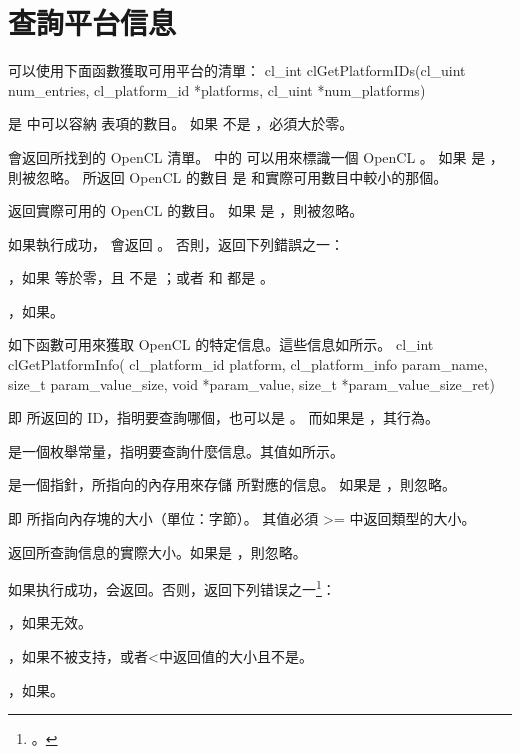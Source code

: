 \section{查詢平台信息}
可以使用下面函數獲取可用平台的清單：
\startclc
cl_int clGetPlatformIDs(cl_uint num_entries,
			cl_platform_id *platforms,
			cl_uint *num_platforms)
\stopclc

 是  中可以容納  表項的數目。
如果  不是 ，必須大於零。

 會返回所找到的 OpenCL  清單。
 中的  可以用來標識一個 OpenCL 。
如果  是 ，則被忽略。
所返回 OpenCL  的數目 是  和實際可用數目中較小的那個。

 返回實際可用的 OpenCL  的數目。
如果  是 ，則被忽略。

如果執行成功， 會返回 。
否則，返回下列錯誤之一：
\startigBase
\item {}，如果  等於零，且  不是 ；或者  和  都是 。
\item {}，如果\schostfailres。
\stopigBase

如下函數可用來獲取 OpenCL 的特定信息。這些信息如所示。
\startclc
cl_int clGetPlatformInfo(
		cl_platform_id platform,
		cl_platform_info param_name,
		size_t param_value_size,
		void *param_value,
		size_t *param_value_size_ret)
\stopclc

 即  所返回的 ID，指明要查詢哪個，也可以是 。
而如果是 ，其行為。

 是一個枚舉常量，指明要查詢什麼信息。其值如所示。

 是一個指針，所指向的內存用來存儲  所對應的信息。
如果是 ，則忽略。

 即  所指向內存塊的大小（單位：字節）。
其值必須 >= 中返回類型的大小。

 返回所查詢信息的實際大小。如果是 ，則忽略。

\cltable
{}
{}

如果执行成功，会返回。否则，返回下列错误之一\footnote{。}：
\startigBase
\item {}，如果无效。
\item {}，如果不被支持，或者<中返回值的大小且不是。
\item {}，如果\schostfailres。
\stopigBase
